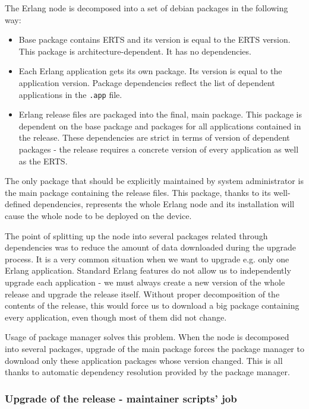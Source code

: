 The Erlang node is decomposed into a set of debian packages in the following way:
\begin{itemize}
\item Base package contains ERTS and its version is equal to the ERTS version. This package is
architecture-dependent. It has no dependencies.
\item Each Erlang application gets its own package. Its version is equal to the application version.
Package dependencies reflect the list of dependent applications in the {\tt .app} file.
\item Erlang release files are packaged into the final, main package. This package is dependent on the base
package and packages for all applications contained in the release. These dependencies are strict in terms
of version of dependent packages - the release requires a concrete version of every application as well as the ERTS.
\end{itemize}

The only package that should be explicitly maintained by system administrator is the main package containing the release files.
This package, thanks to its well-defined dependencies, represents the whole Erlang node and its installation will cause
the whole node to be deployed on the device.

The point of splitting up the node into several packages related through dependencies was to reduce the amount
of data downloaded during the upgrade process. It is a very common situation when we want to upgrade e.g. only
one Erlang application. Standard Erlang features do not allow us to independently upgrade each application - we must
always create a new version of the whole release and upgrade the release itself. Without proper decomposition of the contents
of the release, this would force us to download a big package containing every application, even though most of them did not change.

Usage of package manager solves this problem. When the node is decomposed into several packages, upgrade of the main package
forces the package manager to download only these application packages whose version changed. This is all thanks to automatic
dependency resolution provided by the package manager.

\subsubsection{Upgrade of the release - maintainer scripts' job}


